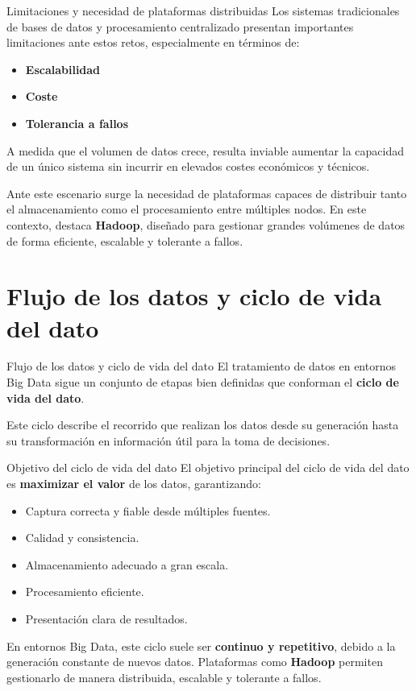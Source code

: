 \documentclass{beamer}
\begin{document}
\begin{frame}{Limitaciones y necesidad de plataformas distribuidas}
Los sistemas tradicionales de bases de datos y procesamiento centralizado presentan importantes limitaciones ante estos retos, especialmente en términos de:
\begin{itemize}
    \item \textbf{Escalabilidad}
    \item \textbf{Coste}
    \item \textbf{Tolerancia a fallos}
\end{itemize}

A medida que el volumen de datos crece, resulta inviable aumentar la capacidad de un único sistema sin incurrir en elevados costes económicos y técnicos.

Ante este escenario surge la necesidad de plataformas capaces de distribuir tanto el almacenamiento como el procesamiento entre múltiples nodos. En este contexto, destaca \textbf{Hadoop}, diseñado para gestionar grandes volúmenes de datos de forma eficiente, escalable y tolerante a fallos.
\end{frame}


\section{Flujo de los datos y ciclo de vida del dato}

\begin{frame}{Flujo de los datos y ciclo de vida del dato}
El tratamiento de datos en entornos Big Data sigue un conjunto de etapas bien definidas que conforman el \textbf{ciclo de vida del dato}.

Este ciclo describe el recorrido que realizan los datos desde su generación hasta su transformación en información útil para la toma de decisiones.
\end{frame}

\begin{frame}{Objetivo del ciclo de vida del dato}
El objetivo principal del ciclo de vida del dato es \textbf{maximizar el valor} de los datos, garantizando:
\begin{itemize}
    \item Captura correcta y fiable desde múltiples fuentes.
    \item Calidad y consistencia.
    \item Almacenamiento adecuado a gran escala.
    \item Procesamiento eficiente.
    \item Presentación clara de resultados.
\end{itemize}

En entornos Big Data, este ciclo suele ser \textbf{continuo y repetitivo}, debido a la generación constante de nuevos datos. Plataformas como \textbf{Hadoop} permiten gestionarlo de manera distribuida, escalable y tolerante a fallos.
\end{frame}
\end{document}
